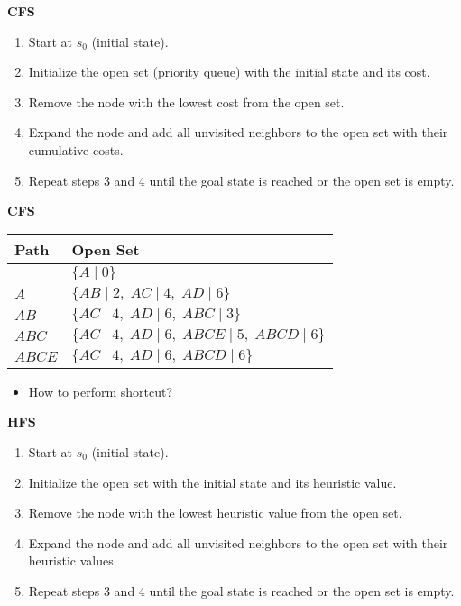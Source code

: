 \begin{process} \textbf{CFS}
    \begin{enumerate}
        \item Start at $s_0$ (initial state).
        \item Initialize the open set (priority queue) with the initial state and its cost.
        \item Remove the node with the lowest cost from the open set.
        \item Expand the node and add all unvisited neighbors to the open set with their cumulative costs.
        \item Repeat steps 3 and 4 until the goal state is reached or the open set is empty.
    \end{enumerate}
\end{process}

\begin{example} \textbf{CFS}
    \begin{center}
        \begin{tabular}{ll}
        \toprule
        \textbf{Path} & \textbf{Open Set} \\
        \midrule
         & $\{A \mid 0\}$ \\
        $A$ & $\{AB \mid 2, \; AC \mid 4, \; AD \mid 6\}$ \\
        $AB$ & $\{AC \mid 4, \; AD \mid 6, \; ABC \mid 3\}$ \\
        $ABC$ & $\{AC \mid 4, \; AD \mid 6, \; ABCE \mid 5, \; ABCD \mid 6\}$ \\
        $ABCE$ & $\{AC \mid 4, \; AD \mid 6, \; ABCD \mid 6\}$ \\
        \bottomrule
        \end{tabular}
    \end{center}
\end{example}

\begin{warning}
    \begin{itemize}
        \item How to perform shortcut? 
    \end{itemize}
\end{warning}

\begin{process} \textbf{HFS}
    \begin{enumerate}
        \item Start at $s_0$ (initial state).
        \item Initialize the open set with the initial state and its heuristic value.
        \item Remove the node with the lowest heuristic value from the open set.
        \item Expand the node and add all unvisited neighbors to the open set with their heuristic values.
        \item Repeat steps 3 and 4 until the goal state is reached or the open set is empty.
    \end{enumerate}
\end{process}

